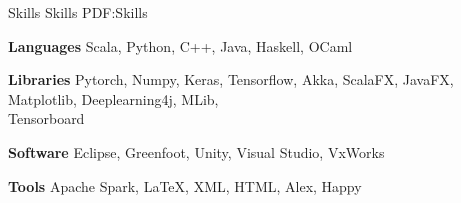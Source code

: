 \Section
{Skills}
{Skills}
{PDF:Skills}

\Entry
\textbf{Languages}
\SubEntry
\Gap
Scala, Python, C++, Java, Haskell, OCaml

\BigGap
\Entry
\textbf{Libraries}
\SubEntry
\Gap
Pytorch, Numpy, Keras, Tensorflow, Akka, ScalaFX, JavaFX, Matplotlib, Deeplearning4j, MLib, \\Tensorboard

\BigGap
\Entry
\textbf{Software}
\SubEntry
\Gap
Eclipse, Greenfoot, Unity, Visual Studio, VxWorks

\BigGap
\Entry
\textbf{Tools}
\SubEntry
\Gap
Apache Spark, LaTeX, XML, HTML, Alex, Happy
